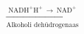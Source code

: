 \documentclass[preview]{standalone}
\begin{document}
\begin{align*}
\xrightarrow[\text{Alkoholi dehüdrogenaas}]{\text{NADH}^{+}\text{H}^{+} \:\rightarrow\: \text{NAD}^{+}}
\end{align*}
\end{document}
